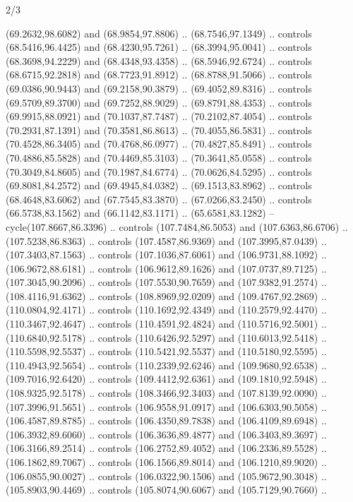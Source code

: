 \begin{flagdescription}{2/3}
\begin{scope}[shift={(0.5\flaglength,0.5)},scale=\flagwidth/320]
\begin{scope}[y=0.8pt, x=0.8pt, yscale=-1,shift={(-118.3,-146)}]
  (69.2632,98.6082) and (68.9854,97.8806) .. (68.7546,97.1349) .. controls
  (68.5416,96.4425) and (68.4230,95.7261) .. (68.3994,95.0041) .. controls
  (68.3698,94.2229) and (68.4348,93.4358) .. (68.5946,92.6724) .. controls
  (68.6715,92.2818) and (68.7723,91.8912) .. (68.8788,91.5066) .. controls
  (69.0386,90.9443) and (69.2158,90.3879) .. (69.4052,89.8316) .. controls
  (69.5709,89.3700) and (69.7252,88.9029) .. (69.8791,88.4353) .. controls
  (69.9915,88.0921) and (70.1037,87.7487) .. (70.2102,87.4054) .. controls
  (70.2931,87.1391) and (70.3581,86.8613) .. (70.4055,86.5831) .. controls
  (70.4528,86.3405) and (70.4768,86.0977) .. (70.4827,85.8491) .. controls
  (70.4886,85.5828) and (70.4469,85.3103) .. (70.3641,85.0558) .. controls
  (70.3049,84.8605) and (70.1987,84.6774) .. (70.0626,84.5295) .. controls
  (69.8081,84.2572) and (69.4945,84.0382) .. (69.1513,83.8962) .. controls
  (68.4648,83.6062) and (67.7545,83.3870) .. (67.0266,83.2450) .. controls
  (66.5738,83.1562) and (66.1142,83.1171) .. (65.6581,83.1282) --
  cycle(107.8667,86.3396) .. controls (107.7484,86.5053) and (107.6363,86.6706)
  .. (107.5238,86.8363) .. controls (107.4587,86.9369) and (107.3995,87.0439) ..
  (107.3403,87.1563) .. controls (107.1036,87.6061) and (106.9731,88.1092) ..
  (106.9672,88.6181) .. controls (106.9612,89.1626) and (107.0737,89.7125) ..
  (107.3045,90.2096) .. controls (107.5530,90.7659) and (107.9382,91.2574) ..
  (108.4116,91.6362) .. controls (108.8969,92.0209) and (109.4767,92.2869) ..
  (110.0804,92.4171) .. controls (110.1692,92.4349) and (110.2579,92.4470) ..
  (110.3467,92.4647) .. controls (110.4591,92.4824) and (110.5716,92.5001) ..
  (110.6840,92.5178) .. controls (110.6426,92.5297) and (110.6013,92.5418) ..
  (110.5598,92.5537) .. controls (110.5421,92.5537) and (110.5180,92.5595) ..
  (110.4943,92.5654) .. controls (110.2339,92.6246) and (109.9680,92.6538) ..
  (109.7016,92.6420) .. controls (109.4412,92.6361) and (109.1810,92.5948) ..
  (108.9325,92.5178) .. controls (108.3466,92.3403) and (107.8139,92.0090) ..
  (107.3996,91.5651) .. controls (106.9558,91.0917) and (106.6303,90.5058) ..
  (106.4587,89.8785) .. controls (106.4350,89.7838) and (106.4109,89.6948) ..
  (106.3932,89.6060) .. controls (106.3636,89.4877) and (106.3403,89.3697) ..
  (106.3166,89.2514) .. controls (106.2752,89.4052) and (106.2336,89.5528) ..
  (106.1862,89.7067) .. controls (106.1566,89.8014) and (106.1210,89.9020) ..
  (106.0855,90.0027) .. controls (106.0322,90.1506) and (105.9672,90.3048) ..
  (105.8903,90.4469) .. controls (105.8074,90.6067) and (105.7129,90.7660) ..

\end{scope}
\end{scope}
\end{flagdescription}
